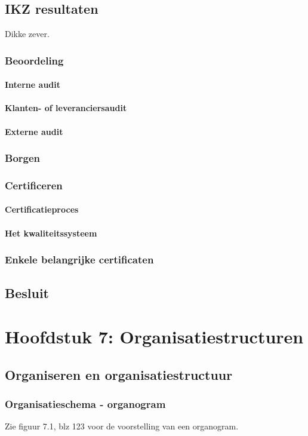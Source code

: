 \documentclass[12pt]{article}
\begin{document}
\subsection{IKZ resultaten}
Dikke zever.
\subsubsection{Beoordeling}
\paragraph{Interne audit}
\paragraph{Klanten- of leveranciersaudit}
\paragraph{Externe audit}
\subsubsection{Borgen}
\subsubsection{Certificeren}
\paragraph{Certificatieproces}
\paragraph{Het kwaliteitssysteem}
\subsubsection{Enkele belangrijke certificaten}
\subsection{Besluit}
\clearpage
\section{Hoofdstuk 7: Organisatiestructuren} 
\subsection{Organiseren en organisatiestructuur}
\subsubsection{Organisatieschema - organogram}
Zie figuur 7.1, blz 123 voor de voorstelling van een organogram.
\end{document}
